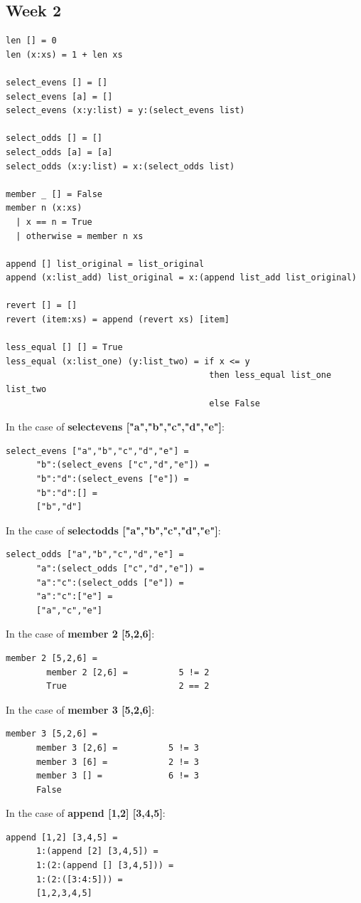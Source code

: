 \documentclass{article}
\theoremstyle{theorem}
\theoremstyle{definition}
\theoremstyle{remark}
\begin{document}
\subsection{Week 2}
\begin{lstlisting}
len [] = 0
len (x:xs) = 1 + len xs

select_evens [] = []
select_evens [a] = []
select_evens (x:y:list) = y:(select_evens list)

select_odds [] = []
select_odds [a] = [a]
select_odds (x:y:list) = x:(select_odds list)

member _ [] = False
member n (x:xs)
  | x == n = True
  | otherwise = member n xs

append [] list_original = list_original
append (x:list_add) list_original = x:(append list_add list_original)

revert [] = []
revert (item:xs) = append (revert xs) [item]

less_equal [] [] = True
less_equal (x:list_one) (y:list_two) = if x <= y
									    then less_equal list_one list_two
									    else False
\end{lstlisting}
In the case of \textbf{select\textunderscore evens ["a","b","c","d","e"]}:
\begin{lstlisting}
select_evens ["a","b","c","d","e"] =
      "b":(select_evens ["c","d","e"]) =
      "b":"d":(select_evens ["e"]) =
      "b":"d":[] = 
      ["b","d"]
\end{lstlisting}
In the case of \textbf{select\textunderscore odds ["a","b","c","d","e"]}:
\begin{lstlisting}
select_odds ["a","b","c","d","e"] =
      "a":(select_odds ["c","d","e"]) =
      "a":"c":(select_odds ["e"]) =
      "a":"c":["e"] = 
      ["a","c","e"]
\end{lstlisting}
In the case of \textbf{member 2 [5,2,6]}:
\begin{lstlisting}
member 2 [5,2,6] = 
        member 2 [2,6] =          5 != 2
        True                      2 == 2
\end{lstlisting}
In the case of \textbf{member 3 [5,2,6]}:
\begin{lstlisting}
member 3 [5,2,6] = 
      member 3 [2,6] =          5 != 3
      member 3 [6] =            2 != 3      
      member 3 [] =             6 != 3
      False
\end{lstlisting}
In the case of \textbf{append [1,2] [3,4,5]}:
\begin{lstlisting}
append [1,2] [3,4,5] =
      1:(append [2] [3,4,5]) =
      1:(2:(append [] [3,4,5])) =
      1:(2:([3:4:5])) =
      [1,2,3,4,5]
\end{lstlisting}
\end{document}
